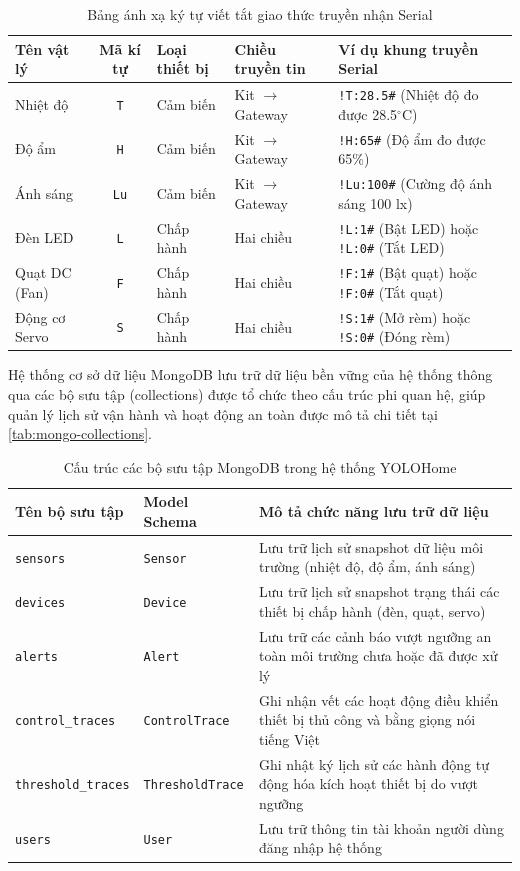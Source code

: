 \begin{table}[H]
\centering
\caption{Bảng ánh xạ ký tự viết tắt giao thức truyền nhận Serial}
\label{tab:serial-protocol}
\begin{tabular}{l c l l p{4.5cm}}
\toprule
\textbf{Tên vật lý} & \textbf{Mã kí tự} & \textbf{Loại thiết bị} & \textbf{Chiều truyền tin} & \textbf{Ví dụ khung truyền Serial} \\
\midrule
Nhiệt độ & \texttt{T} & Cảm biến & Kit $\rightarrow$ Gateway & \texttt{!T:28.5\#} (Nhiệt độ đo được 28.5$^\circ$C) \\
Độ ẩm & \texttt{H} & Cảm biến & Kit $\rightarrow$ Gateway & \texttt{!H:65\#} (Độ ẩm đo được 65\%) \\
Ánh sáng & \texttt{Lu} & Cảm biến & Kit $\rightarrow$ Gateway & \texttt{!Lu:100\#} (Cường độ ánh sáng 100 lx) \\
Đèn LED & \texttt{L} & Chấp hành & Hai chiều & \texttt{!L:1\#} (Bật LED) hoặc \texttt{!L:0\#} (Tắt LED) \\
Quạt DC (Fan) & \texttt{F} & Chấp hành & Hai chiều & \texttt{!F:1\#} (Bật quạt) hoặc \texttt{!F:0\#} (Tắt quạt) \\
Động cơ Servo & \texttt{S} & Chấp hành & Hai chiều & \texttt{!S:1\#} (Mở rèm) hoặc \texttt{!S:0\#} (Đóng rèm) \\
\bottomrule
\end{tabular}
\end{table}

Hệ thống cơ sở dữ liệu MongoDB lưu trữ dữ liệu bền vững của hệ thống thông qua các bộ sưu tập (collections) được tổ chức theo cấu trúc phi quan hệ, giúp quản lý lịch sử vận hành và hoạt động an toàn được mô tả chi tiết tại \autoref{tab:mongo-collections}.

\begin{table}[H]
\centering
\caption{Cấu trúc các bộ sưu tập MongoDB trong hệ thống YOLOHome}
\label{tab:mongo-collections}
\begin{tabular}{p{3.2cm} p{2.8cm} p{9.0cm}}
\toprule
\textbf{Tên bộ sưu tập} & \textbf{Model Schema} & \textbf{Mô tả chức năng lưu trữ dữ liệu} \\
\midrule
\texttt{sensors} & \texttt{Sensor} & Lưu trữ lịch sử snapshot dữ liệu môi trường (nhiệt độ, độ ẩm, ánh sáng) \\
\texttt{devices} & \texttt{Device} & Lưu trữ lịch sử snapshot trạng thái các thiết bị chấp hành (đèn, quạt, servo) \\
\texttt{alerts} & \texttt{Alert} & Lưu trữ các cảnh báo vượt ngưỡng an toàn môi trường chưa hoặc đã được xử lý \\
\texttt{control\_traces} & \texttt{ControlTrace} & Ghi nhận vết các hoạt động điều khiển thiết bị thủ công và bằng giọng nói tiếng Việt \\
\texttt{threshold\_traces} & \texttt{ThresholdTrace} & Ghi nhật ký lịch sử các hành động tự động hóa kích hoạt thiết bị do vượt ngưỡng \\
\texttt{users} & \texttt{User} & Lưu trữ thông tin tài khoản người dùng đăng nhập hệ thống \\
\bottomrule
\end{tabular}
\end{table}

